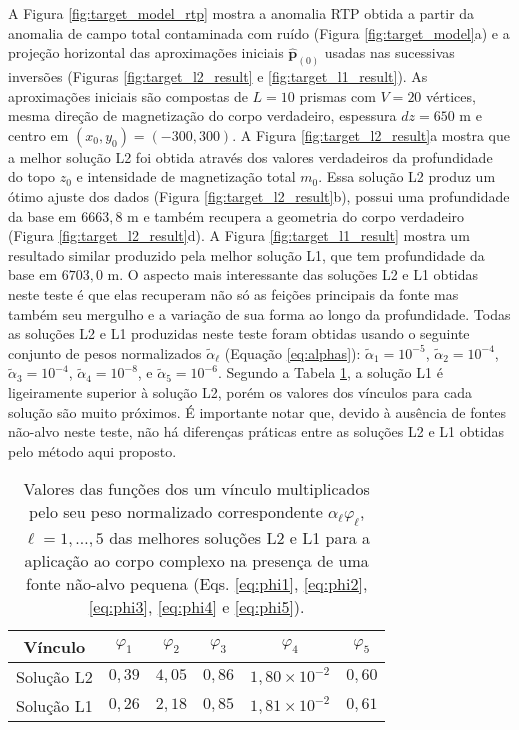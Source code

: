 A Figura \ref{fig:target_model_rtp} mostra a anomalia RTP obtida a partir da anomalia de campo total contaminada com ruído (Figura \ref{fig:target_model}a) e 
a projeção horizontal das aproximações iniciais $\hat{\mathbf{p}}_{(0)}$ 
usadas nas sucessivas inversões (Figuras \ref{fig:target_l2_result} e 
\ref{fig:target_l1_result}).
As aproximações iniciais são compostas de $ L= 10$ prismas com $ V = 20 $ vértices, mesma direção de magnetização do corpo verdadeiro, espessura $ dz=650 $ m e centro em $ (x_0, y_0) = (-300, 300) $.
A Figura \ref{fig:target_l2_result}a mostra que a melhor solução L2 foi obtida através dos valores verdadeiros da profundidade do topo $z_{0}$ e intensidade de magnetização total $m_{0}$. Essa solução L2 produz um ótimo ajuste dos dados (Figura \ref{fig:target_l2_result}b), possui uma profundidade da base em $6663,8$ m e também recupera a geometria do corpo verdadeiro (Figura \ref{fig:target_l2_result}d).
A Figura \ref{fig:target_l1_result} mostra um resultado similar produzido pela melhor solução L1, que tem profundidade da base em $6703,0$ m.
O aspecto mais interessante das soluções L2 e L1 obtidas neste teste é que elas recuperam não só as feições principais da fonte mas também seu mergulho e a variação de sua forma ao longo da profundidade.
Todas as soluções L2 e L1 produzidas neste teste foram obtidas usando o seguinte conjunto de pesos normalizados $\tilde{\alpha}_{\ell}$ (Equação \ref{eq:alphas}): 
$\tilde{\alpha}_{1} = 10^{-5}$, $\tilde{\alpha}_{2} = 10^{-4}$, 
$\tilde{\alpha}_{3} = 10^{-4}$, $\tilde{\alpha}_{4} = 10^{-8}$, e 
$\tilde{\alpha}_{5} = 10^{-6}$. 
Segundo a Tabela \ref{tab:complex}, a solução L1 é ligeiramente superior à solução L2, porém os valores dos vínculos para cada solução são muito próximos.
É importante notar que, devido à ausência de fontes não-alvo neste teste, não há diferenças práticas entre as soluções L2 e L1 obtidas pelo método aqui proposto.


\begin{table}[h]\label{tab:complex}
	\caption{Valores das funções dos um vínculo multiplicados pelo seu peso normalizado correspondente $ \alpha_\ell \varphi_\ell  $, $ \ell=1,\dots,5 $ das melhores soluções L2 e L1 para a aplicação ao corpo complexo na presença de uma fonte não-alvo pequena (Eqs. \ref{eq:phi1}, \ref{eq:phi2}, \ref{eq:phi3}, \ref{eq:phi4} e \ref{eq:phi5}).}
	\centering
	\vspace{0.5cm}
	\begin{tabular}{c|ccccc}
		Vínculo & $ \varphi _1 $ & $ \varphi _2 $ &  $ \varphi _3 $ &  $ \varphi _4 $ &  $ \varphi _5 $ \\
		\hline
		Solução L2 & $ 0,39 $ & $ 4,05 $ & $ 0,86 $ & $1,80 \times 10^{-2} $ & $ 0,60 $ \\ 
		Solução L1 & $ 0,26 $ & $ 2,18 $ & $ 0,85 $ & $1,81 \times 10^{-2} $ & $ 0,61 $
	\end{tabular}
\end{table}

